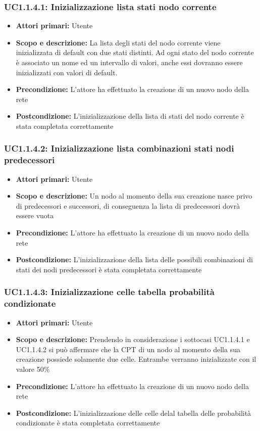 \subsubsection{UC1.1.4.1: Inizializzazione lista stati nodo corrente} 
\begin{itemize} 
	\item{\textbf{Attori primari:} Utente} 
	\item{\textbf{Scopo e descrizione:} La lista degli stati del nodo corrente viene inizializzata di default con due stati distinti. Ad ogni stato del nodo corrente è associato un nome ed un intervallo di valori, anche essi dovranno essere inizializzati con valori di default.} 
	\item{\textbf{Precondizione:} L'attore ha effettuato la creazione di un nuovo nodo della rete} 
	\item{\textbf{Postcondizione:} L'inizializzazione della lista di stati del nodo corrente è stata completata correttamente} 
\end{itemize} 
\subsubsection{UC1.1.4.2: Inizializzazione lista combinazioni stati nodi predecessori} 
\begin{itemize} 
	\item{\textbf{Attori primari:} Utente} 
	\item{\textbf{Scopo e descrizione:} Un nodo al momento della sua creazione nasce privo di predecessori e successori, di conseguenza la lista di predecessori dovrà essere vuota} 
	\item{\textbf{Precondizione:} L'attore ha effettuato la creazione di un nuovo nodo della rete} 
	\item{\textbf{Postcondizione:} L'inizializzazione della lista delle possibili combinazioni di stati dei nodi predecessori è stata completata correttamente} 
\end{itemize} 
\subsubsection{UC1.1.4.3: Inizializzazione celle tabella probabilità condizionate} 
\begin{itemize} 
	\item{\textbf{Attori primari:} Utente} 
	\item{\textbf{Scopo e descrizione:} Prendendo in considerazione i sottocasi UC1.1.4.1 e UC1.1.4.2 si può affermare che la CPT di un nodo al momento della sua creazione possiede solamente due celle. Entrambe verranno inizializzate con il valore 50\%} 
	\item{\textbf{Precondizione:} L'attore ha effettuato la creazione di un nuovo nodo della rete} 
	\item{\textbf{Postcondizione:} L'inizializzazione delle celle delal tabella delle probabilità condizionate è stata completata correttamente} 
\end{itemize} 

